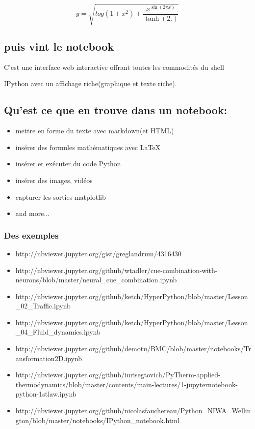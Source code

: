 \documentclass[11pt]{article}
\providecommand{\tightlist}{%
      \setlength{\itemsep}{0pt}\setlength{\parskip}{0pt}}
\begin{document}
    $$y = \sqrt{log(1+x^{2})+\frac{x^{\sin(2\pi x)}}{\tanh(2.)}}$$

    
    \subsection{puis vint le notebook}\label{puis-vint-le-notebook}

C'est une interface web interactive offrant toutes les commodités du
shell

IPython avec un affichage riche(graphique et texte riche).

    \subsection{Qu'est ce que en trouve dans un
notebook:}\label{quest-ce-que-en-trouve-dans-un-notebook}

\begin{itemize}
\tightlist
\item
  mettre en forme du texte avec markdown(et HTML)
\item
  insérer des formules mathématiques avec LaTeX
\item
  insérer et exécuter du code Python
\item
  insérer des images, vidéos
\item
  capturer les sorties matplotlib
\item
  and more...
\end{itemize}

    \subsubsection{Des exemples}\label{des-exemples}

\begin{itemize}
\tightlist
\item
  http://nbviewer.jupyter.org/gist/greglandrum/4316430
\item
  http://nbviewer.jupyter.org/github/wtadler/cue-combination-with-neurons/blob/master/neural\_cue\_combination.ipynb
\item
  http://nbviewer.jupyter.org/github/ketch/HyperPython/blob/master/Lesson\_02\_Traffic.ipynb
\item
  http://nbviewer.jupyter.org/github/ketch/HyperPython/blob/master/Lesson\_04\_Fluid\_dynamics.ipynb
\item
  http://nbviewer.jupyter.org/github/demotu/BMC/blob/master/notebooks/Transformation2D.ipynb
\item
  http://nbviewer.jupyter.org/github/iurisegtovich/PyTherm-applied-thermodynamics/blob/master/contents/main-lectures/1-jupyternotebook-python-1stlaw.ipynb
\item
  http://nbviewer.jupyter.org/github/nicolasfauchereau/Python\_NIWA\_Wellington/blob/master/notebooks/IPython\_notebook.html
\end{itemize}
\end{document}
